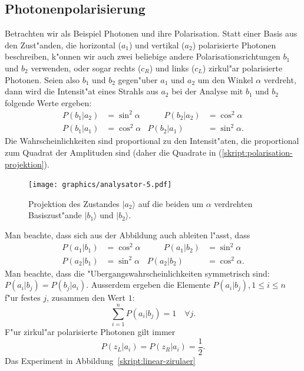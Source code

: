 \subsection{Photonenpolarisierung}
Betrachten wir als Beispiel Photonen und ihre Polarisation. 
Statt einer Basis aus den Zust"anden, die horizontal ($a_1$) und vertikal
($a_2$) polarisierte Photonen beschreiben, k"onnen wir auch zwei 
beliebige andere Polarisationsrichtungen $b_1$ und $b_2$ verwenden,
oder sogar rechts ($c_R$) und links ($c_L$) zirkul"ar polarisierte Photonen.
Seien also $b_1$ und $b_2$ gegen"uber $a_1$ und $a_2$ um den Winkel
$\alpha$ verdreht, dann wird die Intensit"at eines Strahls aus $a_2$
bei der Analyse mit $b_1$ und $b_2$ folgende Werte ergeben:
\begin{equation}
\begin{aligned}
P(b_1|a_2)&=\sin^2\alpha
&\qquad
P(b_2|a_2)&=\cos^2\alpha
\\
P(b_1|a_1)&=\cos^2\alpha
&
P(b_2|a_1)&=\sin^2\alpha.
\end{aligned}
\label{skript:polarisation-projektion}
\end{equation}
Die Wahrscheinlichkeiten sind proportional zu den Intensit"aten,
die proportional zum Quadrat der Amplituden sind (daher die Quadrate
in (\ref{skript:polarisation-projektion}).
\begin{figure}
\centering
\texttt{[image: graphics/analysator-5.pdf]}
\caption{Projektion des Zustandes $|a_2\rangle$ auf die beiden
um $\alpha$ verdrehten Basiszust"ande $|b_1\rangle$ und $|b_2\rangle$.
\label{skript:polarisation-rotation}}
\end{figure}
Man beachte, dass sich aus der Abbildung auch ableiten l"asst, dass
\begin{equation}
\begin{aligned}
P(a_1|b_1)&=\cos^2\alpha
&\qquad
P(a_1|b_2)&=\sin^2\alpha
\\
P(a_2|b_1)&=\sin^2\alpha
&
P(a_2|b_2)&=\cos^2\alpha.
\end{aligned}
\label{skript:polarisation-projektion-inverse}
\end{equation}
Man beachte, dass die "Ubergangswahrscheinlichkeiten
symmetrisch sind: $P(a_i|b_j)=P(b_j|a_i)$.
Ausserdem ergeben die Elemente $P(a_i|b_j), 1\le i\le n$ f"ur festes $j$,
zusammen den Wert $1$:
\[
\sum_{i=1}^nP(a_i|b_j)=1\quad\forall j.
\]
F"ur zirkul"ar polarisierte Photonen gilt immer 
\[
P(z_L|a_i)=P(z_R|a_i)=\frac12.
\]
Das Experiment in Abbildung~\ref{skript:linear-zirulaer} 
